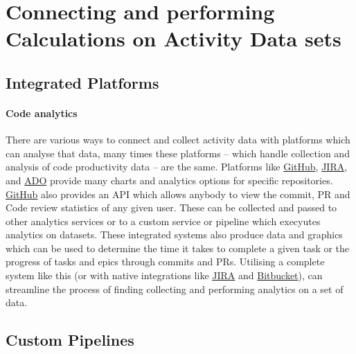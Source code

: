 \documentclass{article}
\begin{document}
    \section{Connecting and performing Calculations on Activity Data sets}

        \subsection{Integrated Platforms}
        \paragraph{Code analytics}
        There are various ways to connect and collect activity data with platforms which can analyse that data, many times these platforms -- which handle collection and analysis of code productivity data -- are the same. Platforms like \href{https://github.com}{GitHub}, \href{https://www.atlassian.com/software/jira}{JIRA}, and \href{https://azure.microsoft.com/en-us/services/devops/}{ADO} provide many charts and analytics options for specific repositories. \href{https://github.com}{GitHub} also provides an API which allows anybody to view the commit, PR and Code review statistics of any given user. These can be collected and passed to other analytics services or to a custom service or pipeline which execyutes analytics on datasets. These integrated systems also produce data and graphics which can be used to determine the time it takes to complete a given task or the progress of tasks and epics through commits and PRs. Utilising a complete system like this (or with native integrations like \href{https://www.atlassian.com/software/jira}{JIRA} and \href{https://www.atlassian.com/software/bitbucket}{Bitbucket}), can streamline the process of finding collecting and performing analytics on a set of data.
        \subsection{Custom Pipelines}
\end{document}
